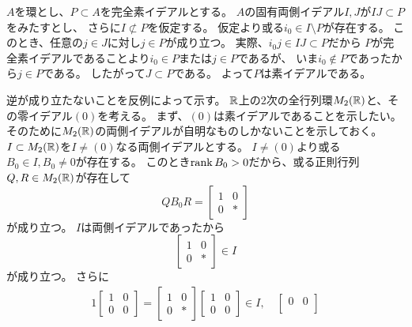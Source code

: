 \documentclass[report]{jlreq}
\begin{document}
\begin{answer}
    $A$を環とし、$P \subset A$を完全素イデアルとする。
    $A$の固有両側イデアル$I, J$が$IJ \subset P$をみたすとし、
    さらに$I \not\subset P$を仮定する。
    仮定より或る$i_0 \in I \setminus P$が存在する。
    このとき、任意の$j \in J$に対し$j \in P$が成り立つ。
    実際、$i_0 j \in IJ \subset P$だから
    $P$が完全素イデアルであることより$i_0 \in P$または$j \in P$であるが、
    いま$i_0 \not\in P$であったから$j \in P$である。
    したがって$J \subset P$である。
    よって$P$は素イデアルである。

    逆が成り立たないことを反例によって示す。
    $\mathbb{R}$上の$2$次の全行列環$M_2(\mathbb{R})$と、その零イデアル$(0)$を考える。
    まず、$(0)$は素イデアルであることを示したい。
    そのために$M_2(\mathbb{R})$の両側イデアルが自明なものしかないことを示しておく。
    $I \subset M_2(\mathbb{R})$を$I \neq (0)$なる両側イデアルとする。
    $I \neq (0)$より或る$B_0 \in I, B_0 \neq 0$が存在する。
    このとき$\operatorname{rank} B_0 > 0$だから、或る正則行列$Q, R \in M_2(\mathbb{R})$が存在して
    \begin{equation}
        QB_0R = \begin{bmatrix}
            1 & 0 \\
            0 & *
        \end{bmatrix}
    \end{equation}
    が成り立つ。
    $I$は両側イデアルであったから
    \begin{equation}
        \begin{bmatrix}
            1 & 0 \\
            0 & *
        \end{bmatrix} \in I
    \end{equation}
    が成り立つ。
    さらに
    \begin{alignat}{1}
        \begin{bmatrix}
            1 & 0 \\
            0 & 0
        \end{bmatrix}
        =
        \begin{bmatrix}
            1 & 0 \\
            0 & *
        \end{bmatrix}
        \begin{bmatrix}
            1 & 0 \\
            0 & 0
        \end{bmatrix}
        \in I,
        \quad
        \begin{bmatrix}
            0 & 0 \\

\end{bmatrix}
\end{alignat}
\end{answer}
\end{document}
